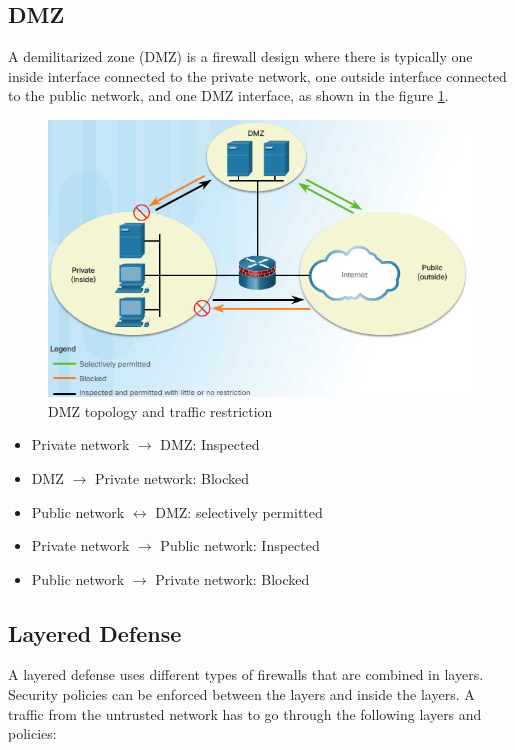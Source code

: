 \subsection{DMZ}

A demilitarized zone (DMZ) is a firewall design where there is typically one inside interface connected to the private network, one outside interface connected to the public network, and one DMZ interface, as shown in the figure \ref{DMZfilter}.

\begin{figure}[hbtp]
\caption{DMZ topology and traffic restriction}\label{DMZfilter}
\centering
\includegraphics[width=10\xm]{pictures/DMZfilter.PNG}
\end{figure}

\begin{itemize}
\item Private network $\rightarrow$ DMZ: Inspected 
\item DMZ  $\rightarrow$ Private network: Blocked
\item Public network  $\leftrightarrow$ DMZ: selectively permitted
\item Private network $\rightarrow$ Public network: Inspected
\item Public network $\rightarrow$ Private network: Blocked
\end{itemize}

\subsection{Layered Defense}

A layered defense uses different types of firewalls that are combined in layers. Security policies can be enforced between the layers and inside the layers. A traffic from the untrusted network has to go through the following layers and policies:

